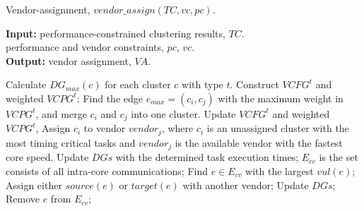 \documentclass[10pt,journal, compsoc]{IEEEtran}
\begin{document}
\begin{algorithm}[!h]
\caption{Vendor-assignment, $vendor\_assign(TC, vc, pc)$.}
\label{alg:VA}
{\textbf{Input:}}
performance-constrained clustering results, $TC$.\\
\hspace*{2.4em} performance and vendor constraints, $pc$, $vc$.\\
{\textbf{Output:}} vendor assignment, $VA$.
\begin{algorithmic}[1]
\STATE Calculate $DG_{max}(c)$ for each cluster $c$ with type $t$.
\STATE Construct $VCFG^t$ and weighted $VCPG^t$;
\STATE Find the edge $e_{max}=(c_i,c_j)$ with the maximum weight in $VCPG^t$, and merge $c_i$ and $c_j$ into one cluster.%
\STATE Update $VCFG^t$ and weighted $VCPG^t$,
\ENDWHILE
    \STATE Assign $c_i$ to vendor $vendor_j$, where $c_i$ is an unassigned cluster with the most timing critical tasks and $vendor_j$ is the available vendor with the fastest core speed.
\ENDWHILE
\ENDFOR
\STATE Update $DGs$ with the determined task execution times;
\STATE $E_{cv}$ is the set consists of all intra-core communications;
\STATE Find $e\in E_{cv}$ with the largest $vul(e)$;
\STATE Assign either $source(e)$ or $target(e)$ with another vendor;
\STATE Update $DGs$;
\ENDIF
\STATE Remove $e$ from $E_{cv}$;
\ENDWHILE
\end{algorithmic}
\end{algorithm}
\end{document}
